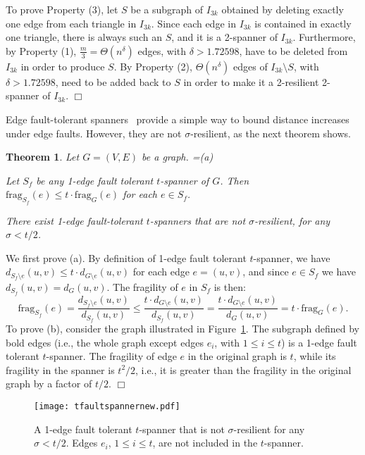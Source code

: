 \documentclass{article}
\newcommand{\dist}          {d}
\newcommand{\frag}          {\mathrm{frag}}
\newtheorem{theorem}{Theorem}
\newcommand{\qed}{\hfill \ensuremath{\Box}}
\newenvironment{proof}{\vspace{1ex}\noindent{\bf Proof.}\hspace{0.5em}}
	{\hfill\qed\vspace{2ex}}
\newenvironment{mylist}[1]{
\setbox1=\hbox{#1}
\begin{list}{}{
\setlength{\labelwidth}{\wd1}
\setlength{\leftmargin}{\wd1}
\addtolength{\leftmargin}{0em}
\addtolength{\leftmargin}{\labelsep}
\setlength{\rightmargin}{1em}}}{\end{list}}
\newcommand{\litem}[1]{\item[#1\hfill]}
\begin{document}
\begin{proof}
To prove Property (3), let $S$ be a subgraph of $I_{3k}$ obtained by deleting exactly one edge from each triangle in $I_{3k}$. Since each edge in $I_{3k}$ is contained in exactly one triangle, there is always such an $S$, and it is a 2-spanner of $I_{3k}$. Furthermore, 
by Property (1), $\frac{m}{3} =\Theta(n^{\delta})$ edges, with $\delta>1.72598$,
 have to be deleted from $I_{3k}$ in order to produce $S$. 
By Property (2),  $\Theta(n^{\delta})$ edges of $I_{3k}\setminus S$, with $\delta>1.72598$, need to be added back to $S$ in order to make it a 2-resilient 2-spanner of $I_{3k}$.
\end{proof}

Edge fault-tolerant spanners~\cite{STOC09}  provide a simple way to bound distance increases under edge faults. However, they are not $\sigma$-resilient, as the next theorem shows.

\begin{theorem}\label{th:boundedshval}
Let $G=(V,E)$ be a graph.
\begin{mylist}{(a)}
\litem{(a)}
Let $S_f$ be any 1-edge fault tolerant $t$-spanner of $G$. Then $\frag_{S_f}(e) \leq t \cdot \frag_G(e)$ for each $e \in S_f$.
\litem{(b)}
There exist 1-edge fault-tolerant $t$-spanners that are not $\sigma$-resilient, for
any $\sigma < t/2$.
\end{mylist}
\end{theorem}
\begin{proof}
We first prove (a). By definition of 1-edge fault tolerant $t$-spanner, we have  
$\dist_{S_f \setminus e}(u,v) \leq t \cdot \dist_{G \setminus e}(u,v)$ for each edge $e=(u,v)$, and since $e \in S_f$ we have 
$\dist_{S_f}(u,v) = \dist_{G}(u,v)$.
The fragility of $e$ in $S_f$ is then:
$$\frag_{S_f}(e) = \frac{\dist_{S_f \setminus e}(u,v)}{\dist_{S_f}(u,v)}
\leq
\frac{t \cdot \dist_{G \setminus e}(u,v)}{\dist_{S_f}(u,v)}
=
\frac{t \cdot \dist_{G \setminus e}(u,v)}{\dist_{G}(u,v)}
=
t \cdot \frag_G(e).$$
To prove (b), consider the graph illustrated in
Figure~\ref{fi:noresilient}. The subgraph defined by bold edges (i.e., the whole graph except edges $e_i$,
with $1 \leq i \leq t$) is a 1-edge fault tolerant $t$-spanner. The fragility of edge $e$ in the original
graph is $t$, while its fragility in the spanner is $t^2/2$, i.e., it is greater than the fragility in the original graph by a factor of $t/2$. 
\end{proof}
\begin{figure}[t]
\begin{center}
\texttt{[image: tfaultspannernew.pdf]}
\end{center}
\caption{A 1-edge fault tolerant $t$-spanner that is not $\sigma$-resilient for any $\sigma<t/2$. Edges $e_i$, $1 \leq i \leq t$, are not included in the $t$-spanner.}\protect\label{fi:noresilient}
\end{figure}	
\end{document}
